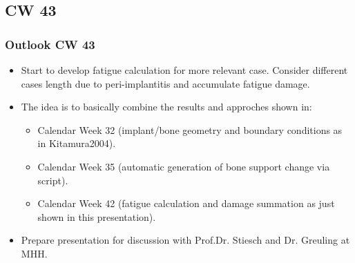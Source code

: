 \subsection{CW 43}
\begin{frame}
  \frametitle{Outlook CW 43}
	\begin{itemize}
		\item Start to develop fatigue calculation for more relevant case. Consider different cases length due to peri-implantitis and accumulate fatigue damage. 
		\item The idea is to basically combine the results and approches shown in:
		\begin{itemize}
		\item Calendar Week 32 (implant/bone geometry and boundary conditions as in Kitamura2004).
		\item Calendar Week 35 (automatic generation of bone support change via script).
		\item Calendar Week 42 (fatigue calculation and damage summation as just shown in this presentation).
	\end{itemize}		
		\item Prepare presentation for discussion with Prof.Dr. Stiesch and Dr. Greuling at MHH.

	\end{itemize}
\end{frame}

